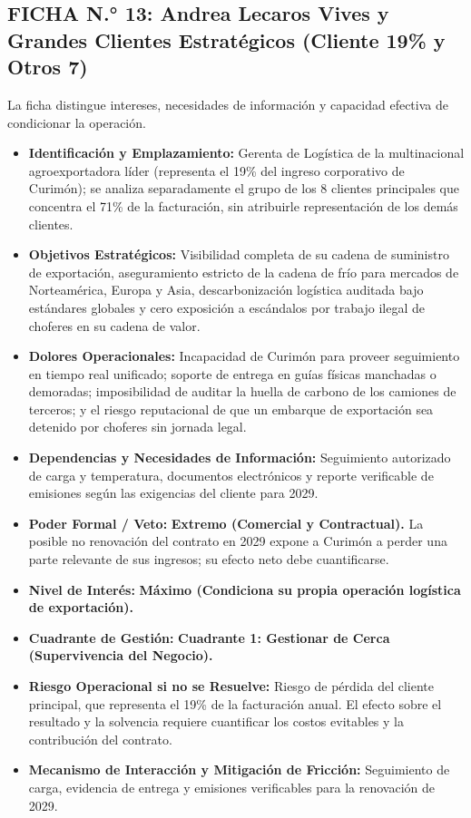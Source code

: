 \subsection*{FICHA N.° 13: Andrea Lecaros Vives y Grandes Clientes Estratégicos (Cliente 19\% y Otros 7)}
La ficha distingue intereses, necesidades de información y capacidad efectiva de condicionar la operación.
\begin{itemize}
\item \textbf{Identificación y Emplazamiento:} Gerenta de Logística de la multinacional agroexportadora líder (representa el 19\% del ingreso corporativo de Curimón); se analiza separadamente el grupo de los 8 clientes principales que concentra el 71\% de la facturación, sin atribuirle representación de los demás clientes.
\item \textbf{Objetivos Estratégicos:} Visibilidad completa de su cadena de suministro de exportación, aseguramiento estricto de la cadena de frío para mercados de Norteamérica, Europa y Asia, descarbonización logística auditada bajo estándares globales y cero exposición a escándalos por trabajo ilegal de choferes en su cadena de valor.
\item \textbf{Dolores Operacionales:} Incapacidad de Curimón para proveer seguimiento en tiempo real unificado; soporte de entrega en guías físicas manchadas o demoradas; imposibilidad de auditar la huella de carbono de los camiones de terceros; y el riesgo reputacional de que un embarque de exportación sea detenido por choferes sin jornada legal.
\item \textbf{Dependencias y Necesidades de Información:} Seguimiento autorizado de carga y temperatura, documentos electrónicos y reporte verificable de emisiones según las exigencias del cliente para 2029.
\item \textbf{Poder Formal / Veto:} \textbf{Extremo (Comercial y Contractual).} La posible no renovación del contrato en 2029 expone a Curimón a perder una parte relevante de sus ingresos; su efecto neto debe cuantificarse.
\item \textbf{Nivel de Interés:} \textbf{Máximo (Condiciona su propia operación logística de exportación).}
\item \textbf{Cuadrante de Gestión:} \textbf{Cuadrante 1: Gestionar de Cerca (Supervivencia del Negocio).}
\item \textbf{Riesgo Operacional si no se Resuelve:} Riesgo de pérdida del cliente principal, que representa el 19\% de la facturación anual. El efecto sobre el resultado y la solvencia requiere cuantificar los costos evitables y la contribución del contrato.
\item \textbf{Mecanismo de Interacción y Mitigación de Fricción:} Seguimiento de carga, evidencia de entrega y emisiones verificables para la renovación de 2029.
\end{itemize}

